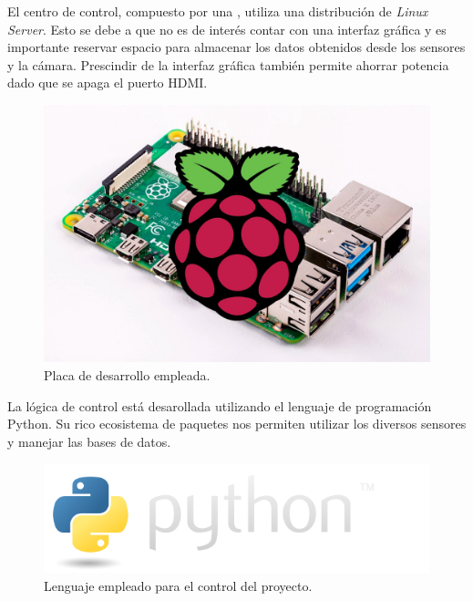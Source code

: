 El centro de control, compuesto por una \rspi, utiliza una distribución de \textit{Linux Server}. Esto se debe a que no es de interés contar con una interfaz gráfica y es importante reservar espacio para almacenar los datos obtenidos desde los sensores y la cámara. 
Prescindir de la interfaz gráfica también permite ahorrar potencia dado que se apaga el puerto HDMI.

\begin{figure}[H]
	\centering
	\includegraphics[width=0.7\linewidth]{"../Ingenieria de Detalle/ImagenesIngenieria de Detalle/rpi_with_board"}
	\caption{Placa de desarrollo empleada.}
	\label{fig:rpiwhiteboard}
\end{figure}



La lógica de control está desarollada utilizando el lenguaje de programación Python. Su rico ecosistema de paquetes nos permiten utilizar los diversos sensores y manejar las bases de datos.

\begin{figure}[H]
	\centering
	\includegraphics[width=0.7\linewidth]{"../Ingenieria de Detalle/ImagenesIngenieria de Detalle/python-logo@2x"}
	\caption{Lenguaje empleado para el control del proyecto.}
	\label{fig:python-logo2x}
\end{figure}










